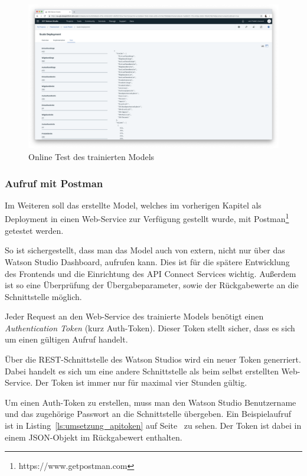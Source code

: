 \begin{figure}[h]
    \centering
    \includegraphics[width=\textwidth]{images/kapitel_3/deployment_test.png}
    \caption{Online Test des trainierten Models}
    \label{fig:umsetzung_deployment_test}
\end{figure}

\subsubsection{Aufruf mit Postman}
\label{subsec:Aufruf mit Postman}
Im Weiteren soll das erstellte Model, welches im vorherigen Kapitel als Deployment in einen Web-Service zur Verfügung
gestellt wurde, mit Postman\footnote{https://www.getpostman.com} getestet werden.

So ist sichergestellt, dass man das Model auch von extern, nicht nur über das Watson Studio Dashboard, aufrufen kann.
Dies ist für die spätere Entwicklung des Frontends und die Einrichtung des API Connect Services wichtig. Außerdem ist
so eine Überprüfung der Übergabeparameter, sowie der Rückgabewerte an die Schnittstelle möglich.

Jeder Request an den Web-Service des trainierte Models benötigt einen \textit{Authentication Token} (kurz Auth-Token).
Dieser Token stellt sicher, dass es sich um einen gültigen Aufruf handelt.

Über die REST-Schnittstelle des Watson Studios wird ein neuer Token generriert. Dabei handelt es sich um eine andere
Schnittstelle als beim selbst erstellten Web-Service. Der Token ist immer nur für maximal vier Stunden gültig.

Um einen Auth-Token zu erstellen, muss man den Watson Studio Benutzername und das zugehörige Passwort an die
Schnittstelle übergeben. Ein Beispielaufruf ist in Listing~\ref{ls:umsetzung_apitoken} auf
Seite~\pageref{ls:umsetzung_apitoken} zu sehen. Der Token ist dabei in einem JSON-Objekt im Rückgabewert enthalten.

